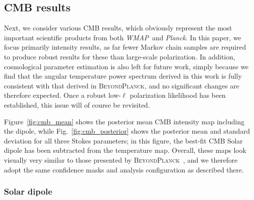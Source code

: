 \documentclass[twocolumn]{../../common/aa}
\def\WMAP{\emph{WMAP}}
\def\Planck{\emph{Planck}}
\newcommand{\BP}{\textsc{BeyondPlanck}}
\newcommand{\bp}{\textsc{BeyondPlanck}}
\begin{document}



\subsection{CMB results}
\label{sec:cmb}


Next, we consider various CMB results, which obviously represent the most important scientific products from both \WMAP\ and \Planck. In this paper, we focus primarily intensity results, as far fewer Markov chain samples are required to produce robust results for these than large-scale polarization. In addition, cosmological parameter estimation is also left for future work, simply because we find that the angular temperature power spectrum derived in this work is fully consistent with that derived in \BP, and no significant changes are therefore expected. Once a robust low-$\ell$ polarization likelihood has been established, this issue will of course be revisited.

Figure~\ref{fig:cmb_mean} shows the posterior mean CMB intensity map including the dipole, while Fig.~\ref{fig:cmb_posterior} shows the posterior mean and standard deviation for all three Stokes parameters; in this figure, the best-fit CMB Solar dipole has been subtracted from the temperature map. Overall, these maps look visually very similar to those presented by \bp\ \citep{bp13}, and we therefore adopt the same confidence masks and analysis configuration as described there.



\subsubsection{Solar dipole}
\label{sec:dipole}
\end{document}
